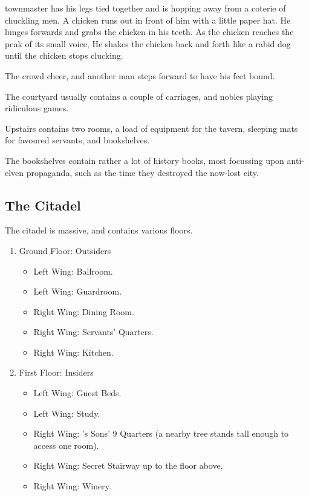\begin{multicols}{2}
\begin{boxtext}

	\Gls{townmaster} has his legs tied together and is hopping away from a coterie of chuckling men.
	 A chicken runs out in front of him with a little paper hat.
	 He lunges forwards and grabs the chicken in his teeth.
	 As the chicken reaches the peak of its small voice, He shakes the chicken back and forth like a rabid dog until the chicken stops clucking.

	The crowd cheer, and another man steps forward to have his feet bound.

\end{boxtext}

The courtyard usually contains a couple of carriages, and nobles playing ridiculous games.



Upstairs contains two rooms, a load of equipment for the tavern, sleeping mats for favoured servants, and bookshelves.

The bookshelves contain rather a lot of history books, most focussing upon anti-elven propaganda, such as the time they destroyed the now-lost city.
 
\subsection{The Citadel}\label{citadel}
The citadel is massive, and contains various floors.

\begin{enumerate}

	\item{Ground Floor: Outsiders}
		\begin{itemize}
			\item{Left Wing: Ballroom.}
			\item{Left Wing: Guardroom.}
			\item{Right Wing: Dining Room.}
			\item{Right Wing: Servants' Quarters.}
			\item{Right Wing: Kitchen.}
		\end{itemize}
	\item{First Floor: Insiders}
		\begin{itemize}
			\item{Left Wing: Guest Beds.}
			\item{Left Wing: Study.}
			\item{Right Wing: 's Sons' 9 Quarters (a nearby tree stands tall enough to access one room).}
			\item{Right Wing: Secret Stairway up to the floor above.}
			\item{Right Wing: Winery.}
		\end{itemize}


\end{enumerate}
\end{multicols}
